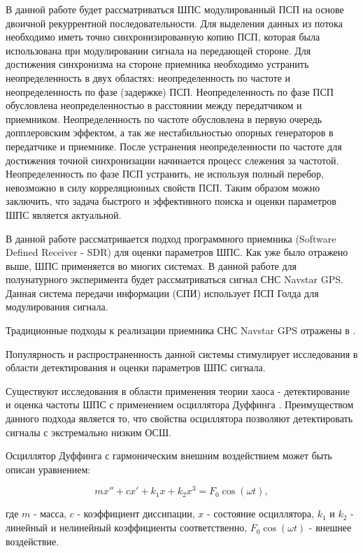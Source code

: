 В данной работе будет рассматриваться ШПС модулированный ПСП на основе двоичной рекуррентной последовательности.
Для выделения данных из потока необходимо иметь точно синхронизированную копию ПСП, которая была использована
при модулировании сигнала на передающей стороне. Для достижения синхронизма на стороне приемника необходимо
устранить неопределенность в двух областях: неопределенность по частоте и неопределенность по фазе (задержке) ПСП.
Неопределенность по фазе ПСП обусловлена неопределенностью в расстоянии между передатчиком и приемником. Неопределенность
по частоте обусловлена в первую очередь допплеровским эффектом, а так же нестабильностью опорных генераторов в
передатчике и приемнике. После устранения неопределенности по частоте для достижения точной синхронизации
начинается процесс слежения за частотой. Неопределенность по фазе ПСП устранить, не используя полный перебор,
невозможно в силу корреляционных свойств ПСП. Таким образом можно заключить, что задача быстрого и эффективного
поиска и оценки параметров ШПС является актуальной.

В данной работе рассматривается подход программного приемника (Software Defined Receiver - SDR)
\cite{akos-book, grayver-book, pany-book} для оценки параметров ШПС. Как уже было отражено выше, ШПС применяется во
многих системах. В данной работе для полунатурного эксперимента будет рассматриваться сигнал СНС Navstar GPS. Данная система передачи 
информации (СПИ) использует ПСП Голда \cite{gold-ieee} для модулирования сигнала.

Традиционные подходы к реализации приемника СНС Navstar GPS отражены в \cite{akos-book, tsui}. 

Популярность и распространенность данной системы стимулирует исследования в области детектирования
и оценки параметров ШПС сигнала.

Существуют исследования в области применения теории хаоса - детектирование и оценка
частоты ШПС с применением осциллятора Дуффинга \cite{chaos_cambridge, chaos_chen, chaos_huang, chaos_wang}. Преимуществом
данного подхода является то, что свойства осциллятора позволяют детектировать сигналы с экстремально низким ОСШ.

Осциллятор Дуффинга с гармоническим внешним воздействием может быть описан уравнением:
\begin{center}
\begin{equation}
	\label{eq:duffing}
	mx'' + cx' + k_{1}x + k_{2}x^3 = F_{0}\cos(\omega{t}),
\end{equation}
\end{center}
где $m$ - масса, $c$ - коэффициент диссипации, $x$ - состояние осциллятора, $k_1$ и $k_2$ - линейный и нелинейный коэффициенты соответственно,
$F_{0}\cos(\omega{t})$ - внешнее воздействие.

